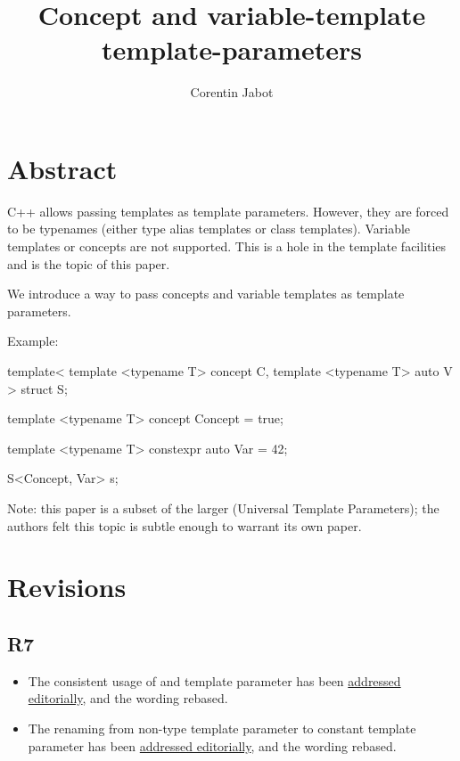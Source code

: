 \documentclass{wg21}
\title{Concept and variable-template template-parameters}
\author{Corentin Jabot}{corentin.jabot@gmail.com}
\begin{document}
\maketitle

\section{Abstract}

C++ allows passing templates as template parameters.
However, they are forced to be typenames (either type alias templates or class templates).
Variable templates or concepts are not supported.
This is a hole in the template facilities and is the topic of this paper.

We introduce a way to pass concepts and variable templates as template parameters.

Example:

\begin{colorblock}
template<
   template <typename T> concept C,
   template <typename T> auto V
>
struct S{};

template <typename T>
concept Concept = true;

template <typename T>
constexpr auto Var = 42;

S<Concept, Var> s;
\end{colorblock}

Note: this paper is a subset of the larger  (Universal Template Parameters); the authors felt this topic is subtle enough to warrant its own paper.

\section{Revisions}

\subsection{R7}
\begin{itemize}
\item The consistent usage of  and template parameter has been \href{https://github.com/cplusplus/draft/pull/7460}{addressed editorially}, and the wording rebased.
\item The renaming from non-type template parameter to constant template parameter has been \href{https://github.com/cplusplus/draft/pull/7587}{addressed editorially}, and the wording rebased.
\end{itemize}
\end{document}
